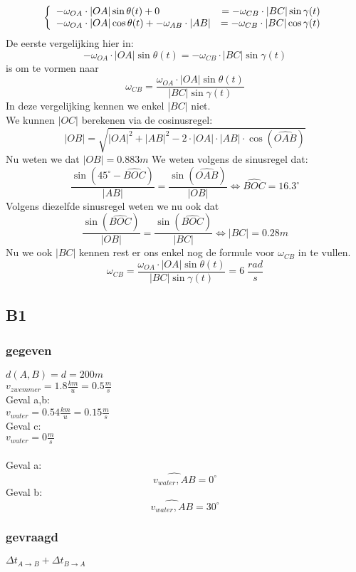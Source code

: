 \documentclass[10pt,a4paper]{article}
\begin{document}
\[
\left\lbrace
\begin{array}{l r}
-\omega_{OA} \cdot |OA|\sin{\theta(t)} + 0 &= -\omega_{CB} \cdot |BC|\sin{\gamma(t)}\\
-\omega_{OA} \cdot |OA|\cos{\theta(t)} + -\omega_{AB} \cdot |AB| &= -\omega_{CB} \cdot |BC|\cos{\gamma(t)}\\
\end{array}
\right.
\]
De eerste vergelijking hier in:
\[
-\omega_{OA} \cdot |OA|\sin{\theta(t)}= -\omega_{CB} \cdot |BC|\sin{\gamma(t)}
\]
is om te vormen naar
\[
\omega_{CB} = \frac{\omega_{OA} \cdot |OA|\sin{\theta(t)}}{|BC|\sin{\gamma(t)}}
\]
In deze vergelijking kennen we enkel $|BC|$ niet.\\
We kunnen $|OC|$ berekenen via de cosinusregel: 
\[
|OB| = \sqrt{|OA|^{2} + |AB|^{2} - 2 \cdot |OA| \cdot |AB| \cdot \cos(\hat{OAB})}
\]
Nu weten we dat $|OB| = 0.883m$
We weten volgens de sinusregel dat:
\[
\frac{\sin(45^\circ-\hat{BOC})}{|AB|} = \frac{\sin(\hat{OAB})}{|OB|} \Leftrightarrow \hat{BOC} = 16.3^\circ
\]
Volgens diezelfde sinusregel weten we nu ook dat
\[
\frac{\sin(\hat{BOC})}{|OB|} = \frac{\sin(\hat{BOC})}{|BC|}
\Leftrightarrow |BC| = 0.28m
\]
Nu we ook $|BC|$ kennen rest er ons enkel nog de formule voor $\omega_{CB}$ in te vullen.
\[
\omega_{CB} = \frac{\omega_{OA} \cdot |OA|\sin{\theta(t)}}{|BC|\sin{\gamma(t)}} = 6\;\frac{rad}{s}
\]

\subsection{B1}
\subsubsection*{gegeven}
$d(A,B) = d = 200m$\\
$v_{zwemmer}=1.8\frac{km}{u}=0.5\frac{m}{s}$\\
Geval a,b:\\
$v_{water}= 0.54\frac{km}{u}=0.15\frac{m}{s}$\\
Geval c:\\
$v_{water}= 0\frac{m}{s}$\\\\
Geval a: \[\widehat{v_{water},AB} = 0^\circ\]
Geval b: \[\widehat{v_{water},AB} = 30^\circ\]

\subsubsection*{gevraagd}
$\Delta t_{A\rightarrow B} + \Delta t_{B\rightarrow A}$
\end{document}
